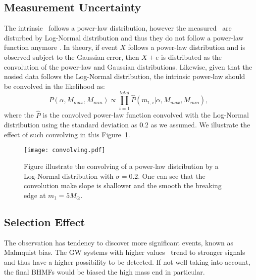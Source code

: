 \documentclass[twocolumn]{aastex62}
\begin{document}
\subsection{Measurement Uncertainty}\label{sec_likelihood_noise}
The intrinsic \mone\ follows a power-law distribution, however the measured  \mone\ are disturbed by Log-Normal distribution and thus they do not follow a power-law function anymore \citep{Koen2009}. In theory, if event $X$ follows a power-law distribution and is observed subject to the Gaussian error, then $X + e$ is distributed as the convolution of the power-law and Gaussian distributions. Likewise, given that the nosied data follows the Log-Normal distribution, the intrinsic power-law should be convolved in the likelihood as:
 \begin{equation} \label{equ_lik_conv}
 P(\alpha, M_{max}, M_{min}) \propto  \prod_{i=1}^{total} \hat{P}(m_{1,i}|\alpha, M_{max}, M_{min}),
 \end{equation}
where the $\hat{P}$ is the convolved power-law function convolved with the Log-Normal distribution using the standard deviation as 0.2 as we assumed. We illustrate the effect of such convolving in this Figure~\ref{fig:result_slope}.

\begin{figure}%
\texttt{[image: convolving.pdf]}
\caption{
Figure illustrate the convolving of a power-law distribution by a Log-Normal distribution with $\sigma = 0.2$. One can see that the convolution make slope is shallower and the smooth the breaking edge at $m_1 = 5 M_{\odot}$.
}
\label{fig:result_slope}
\end{figure}

\subsection{Selection Effect}\label{sec_likelihood_sf}
The observation has tendency to discover more significant events, known as Malmquist bias. The GW systems with higher values \mone\ trend to stronger signals and thus have a higher possibility to be detected. If not well taking into account, the final BHMFs would be biased the high mass end in particular.
\end{document}
